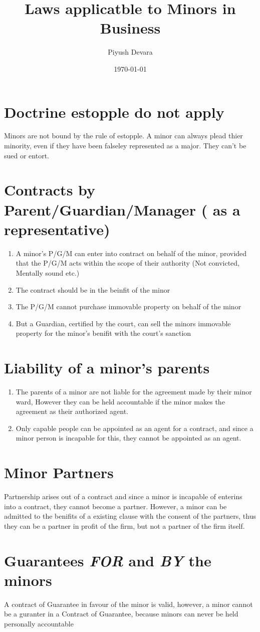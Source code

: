 \documentclass{article}
\title{Laws applicatble to Minors in Business}
\date{\today}
\author{Piyush Devara}
\begin{document}
\maketitle

\section{Doctrine estopple do not apply} {
  Minors are not bound by the rule of estopple. A minor can always plead thier minority, even if they have been falseley represented as a major. They can't be sued or entort.
 }

\section{Contracts by Parent/Guardian/Manager ( as a representative)} {
  \begin{enumerate}
	  \item A minor's P/G/M can enter into contract on behalf of the minor, provided that the P/G/M acts within the scope of their authority (Not convicted, Mentally sound etc.)
	  \item The contract should be in the beinfit of the minor
	  \item The P/G/M cannot purchase immovable property on behalf of the minor
	  \item But a Guardian, certified by the court, can sell the minors immovable property for the minor's benifit with the court's sanction
  \end{enumerate}
 }

\section{Liability of a minor's parents} {
  \begin{enumerate}
	  \item The parents of a minor are not liable for the agreement made by their minor ward, However they can be held accountable if the minor makes the agreement as their authorized agent.
	  \item Only capable people can be appointed as an agent for a contract, and since a minor person is incapable for this, they cannot be appointed as an agent.
  \end{enumerate}
 }

\section{Minor Partners} {
  Partnership arises out of a contract and since a minor is incapable of enterins into a contract, they cannot become a partner. However, a minor can be admitted to the benifits of a existing clause with the consent of the partners, thus they can be a partner in profit of the firm, but not a partner of the firm itself.
 }

\section {Guarantees \textit{FOR} and \textit{BY} the minors} {
  A contract of Guarantee in favour of the minor is valid, however, a minor cannot be a guranter in a Contract of Guarantee, because minors can never be held personally accountable
 }
\end{document}
